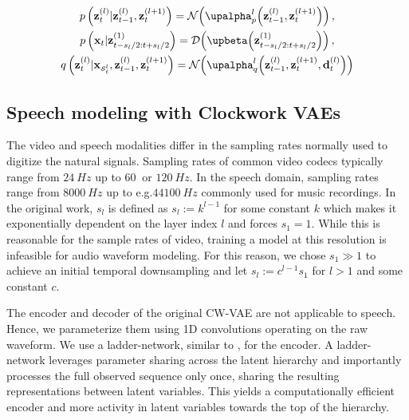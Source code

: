 {%
\begin{gather}
    p\left(\zb_t^{(l)}|\zb_{t-1}^{(l)},\zb_{t}^{(l+1)}\right) = \mathcal{N}\pa{\alphab_{p}^{l}\pa{\zb_{t-1}^{(l)},\zb_t^{(l+1)}}} \, , \\ \nonumber
    p\left(\xb_t|\zb^{(1)}_{t-s_l/2:t+s_l/2}\right) = \mathcal{D}\pa{\betab\pa{\zb^{(1)}_{t-s_l/2:t+s_l/2}}} \, , \\
    q\left(\zb_t^{(l)}|\xb_{\scriptscriptstyle\mathcal{S}_t^l},\zb_{t-1}^{(l)},\zb_t^{(l+1)}\right) = \mathcal{N}\pa{\alphab_{q}^{l}\pa{\zb_{t-1}^{(l)},\zb_{t}^{(l+1)},\db_t^{(l)}}} \nonumber
\end{gather}


\subsection{Speech modeling with Clockwork VAEs} \label{sec: cwvae on speech}
The video and speech modalities differ in the sampling rates normally used to digitize the natural signals. Sampling rates of common video codecs typically range from $\SI{24}{Hz}$ up to $\SI{60}{}$ or $\SI{120}{Hz}$. In the speech domain, sampling rates range from $\SI{8000}{Hz}$ up to e.g.\@ $\SI{44100}{Hz}$ commonly used for music recordings. In the original work, $s_l$ is defined as $s_l:= k^{l-1}$ for some constant $k$ which makes it exponentially dependent on the layer index $l$ and forces $s_1 = 1$. While this is reasonable for the sample rates of video, training a model at this resolution is infeasible for audio waveform modeling. For this reason, we chose $s_1 \gg 1$ to achieve an initial temporal downsampling and let $s_l:= c^{l-1}s_1$ for $l>1$ and some constant $c$.

The encoder and decoder of the original CW-VAE are not applicable to speech. Hence, we parameterize them using 1D convolutions operating on the raw waveform. We use a ladder-network, similar to \textcite{sonderby_ladder_2016, aksan_stcn_2019}, for the encoder. A ladder-network leverages parameter sharing across the latent hierarchy and importantly processes the full observed sequence only once, sharing the resulting representations between latent variables. This yields a computationally efficient encoder and more activity in latent variables towards the top of the hierarchy.


}
